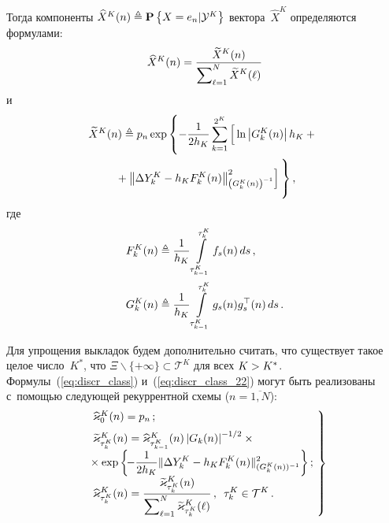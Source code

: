 \begin{multicols}{2}
  Тогда компоненты $\widehat{X}^K(n) \triangleq \mathbf{P}\left\{ X=e_n|\mathcal{Y}^K \right\}$ 
  вектора~$\widehat{X}^K$ определяются формулами:
    \begin{equation}
    \widehat{X}^K(n) = \displaystyle\frac{\displaystyle \widetilde{X}^K(n)\mathstrut}{\displaystyle \sum\nolimits_{\ell=1}^N \widetilde{X}^K(\ell)
  \mathstrut}
  \label{eq:discr_class}
  \end{equation}
  и
    \begin{multline}
  \widetilde{X}^K(n) \triangleq p_n\exp\left\{
  -\fr{1}{2h_K}\sum\limits_{k=1}^{2^K}\left[
  \vphantom{\left\|\Delta Y^K_k-h_K F_k^K(n)\right\|^2_{
  \left(G_k^K(n)\right)^{-1}}}
  \ln\left\vert G_k^K(n)\right\vert h_K +{}\right.\right.\\
\left.\left.  {}+ \left\|\Delta Y^K_k-h_K F_k^K(n)\right\|^2_{
  \left(G_k^K(n)\right)^{-1}}
  \right]
  \vphantom{\sum\limits_{k=1}^{2^K}}
  \right\},
 \label{eq:discr_class_22}
  \end{multline}
где
\begin{align*}
  F_k^K(n) &
  \triangleq     \displaystyle\frac{\displaystyle 1\mathstrut}{\displaystyle h_K\mathstrut}  \int\limits_{\tau_{k-1}^K}^{\tau_{k}^K}f_s(n)\,ds\,, 
  \\
  G_k^K(n) &\triangleq \displaystyle\frac{\displaystyle 1\mathstrut}{\displaystyle h_K\mathstrut} \int\limits_{\tau_{k-1}^K}^{\tau_{k}^K}g_s(n)g_s^{\top}(n)\,ds\,.
  \end{align*}

Для упрощения выкладок будем дополнительно считать, что существует такое 
целое число~$K^*$, что $\Xi \backslash \{+\infty\} \subset \mathcal{T}^K$ 
для всех  $K \hm> K^*$.
Формулы~(\ref{eq:discr_class}) и~(\ref{eq:discr_class_22}) могут быть реализованы 
с~по\-мощью сле\-ду\-ющей рекуррентной схемы ($n=\overline{1,N}$):
\begin{equation}
\left.
\begin{array}{l}
\widehat{\varkappa}_0^K(n) = p_n\,;\\[6pt]
\widetilde{\varkappa}_{\tau_{k}^{K}}^K(n) = \widehat{\varkappa}_{\tau_{k-1}^{K}}^K(n)
\left|G_k(n)\right|^{-1/2}\times{}\\
\hspace*{-1.5mm}{}\times
\exp \displaystyle\left\{\! -\displaystyle\frac{\displaystyle 1\mathstrut}{\displaystyle 2h_K\mathstrut}\|\Delta Y_k^K-h_K F_k^K(n)\|^2_{(G_k^K(n))^{-1}}
\right\};\\[6pt]
\displaystyle \widehat{\varkappa}_{\tau_{k}^{K}}^K(n) = 
\displaystyle\frac{\displaystyle \widetilde{\varkappa}_{\tau_{k}^{K}}^K(n)\mathstrut}{\displaystyle \sum\nolimits_{\ell=1}^N \widetilde{\varkappa}_{\tau_{k}^{K}}^K(\ell)\mathstrut}\,, \enskip
\tau_{k}^{K} \in \mathcal{T}^K\,.
\end{array}\!
\right\}\!\!
\label{eq:sch_norm_2}
\end{equation}


\end{multicols}
